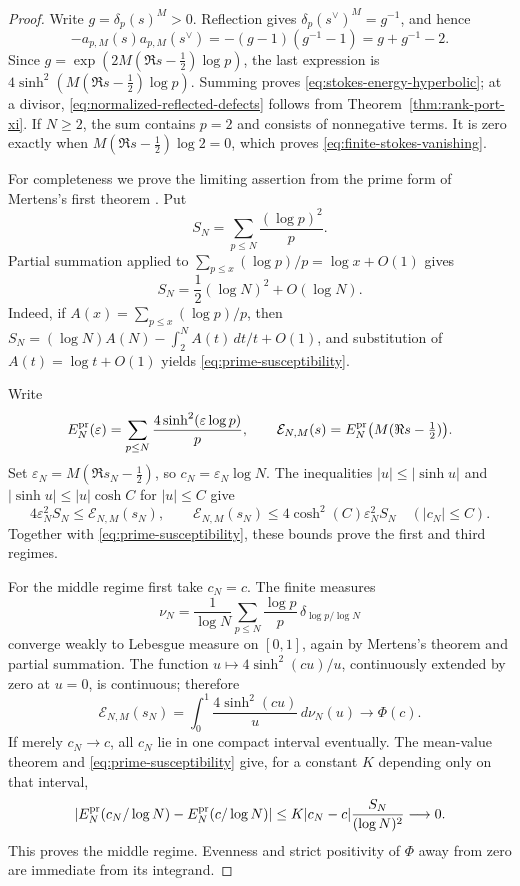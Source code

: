 \documentclass[11pt,a4paper]{amsart}
\theoremstyle{plain}
\theoremstyle{definition}
\begin{document}
\begin{proof}
Write $g=\delta_p(s)^M>0$.  Reflection gives
$\delta_p(s^\vee)^M=g^{-1}$, and hence
\[
 -a_{p,M}(s)a_{p,M}(s^\vee)
 =-(g-1)(g^{-1}-1)=g+g^{-1}-2.
\]
Since
$g=\exp(2M(\Re s-\tfrac12)\log p)$, the last expression is
$4\sinh^2(M(\Re s-\tfrac12)\log p)$.  Summing proves
\eqref{eq:stokes-energy-hyperbolic}; at a divisor,
\eqref{eq:normalized-reflected-defects} follows from
Theorem~\ref{thm:rank-port-xi}.  If $N\geq2$, the sum contains $p=2$ and consists of nonnegative
terms.  It is zero exactly when
$M(\Re s-\tfrac12)\log2=0$, which proves \eqref{eq:finite-stokes-vanishing}.

For completeness we prove the limiting assertion from the prime form of Mertens's first theorem
\cite{Mertens1874}.
Put
\[
 S_N=\sum_{p\leq N}\frac{(\log p)^2}{p}.
\]
Partial summation applied to
$\sum_{p\leq x}(\log p)/p=\log x+O(1)$ gives
\begin{equation}\label{eq:prime-susceptibility}
                 S_N=\frac12(\log N)^2+O(\log N).
\end{equation}
Indeed, if $A(x)=\sum_{p\leq x}(\log p)/p$, then
$S_N=(\log N)A(N)-\int_2^NA(t)\,dt/t+O(1)$, and substitution of
$A(t)=\log t+O(1)$ yields \eqref{eq:prime-susceptibility}.

Write
\[
 E_N^{\rm pr}(\varepsilon)=
   \sum_{p\leq N}\frac{4\sinh^2(\varepsilon\log p)}p,
 \qquad
 \mathcal E_{N,M}(s)=E_N^{\rm pr}\bigl(M(\Re s-\tfrac12)\bigr).
\]
Set $\varepsilon_N=M(\Re s_N-\tfrac12)$, so $c_N=\varepsilon_N\log N$.
The inequalities $|u|\leq|\sinh u|$ and
$|\sinh u|\leq|u|\cosh C$ for $|u|\leq C$ give
\begin{equation}\label{eq:stokes-energy-sandwich}
 4\varepsilon_N^2S_N\leq\mathcal E_{N,M}(s_N),
 \qquad
 \mathcal E_{N,M}(s_N)\leq4\cosh^2(C)\varepsilon_N^2S_N
 \quad(|c_N|\leq C).
\end{equation}
Together with \eqref{eq:prime-susceptibility}, these bounds prove the first and third regimes.

For the middle regime first take $c_N=c$.  The finite measures
\[
 \nu_N=\frac1{\log N}\sum_{p\leq N}\frac{\log p}{p}
             \,\delta_{\log p/\log N}
\]
converge weakly to Lebesgue measure on $[0,1]$, again by Mertens's theorem and partial summation.
The function $u\mapsto4\sinh^2(cu)/u$, continuously extended by zero at $u=0$, is continuous;
therefore
\[
 \mathcal E_{N,M}(s_N)=
 \int_0^1\frac{4\sinh^2(cu)}u\,d\nu_N(u)\longrightarrow\Phi(c).
\]
If merely $c_N\to c$, all $c_N$ lie in one compact interval eventually.  The mean-value theorem
and \eqref{eq:prime-susceptibility} give, for a constant $K$ depending only on that interval,
\[
 \left|E_N^{\rm pr}(c_N/\log N)-E_N^{\rm pr}(c/\log N)\right|
 \leq K|c_N-c|\frac{S_N}{(\log N)^2}\longrightarrow0.
\]
This proves the middle regime.  Evenness and strict positivity of $\Phi$ away from zero are
immediate from its integrand.
\end{proof}
\end{document}
